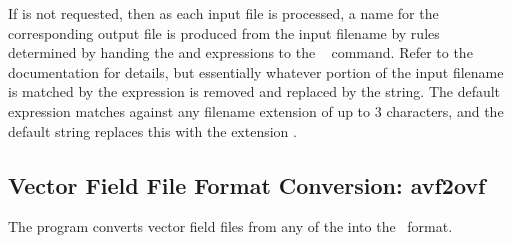 If  is not requested, then as each input file is
processed, a name for the corresponding output file is produced from
the input filename by rules determined by handing the 
and  expressions to the \Tcl\  command.  Refer
to the \Tcl\  documentation for details, but essentially
whatever portion of the input filename is matched by the 
expression is removed and replaced by the  string.  The
default  expression matches against any filename
extension of up to 3 characters, and the default  string
replaces this with the extension .


\subsection{Vector Field File Format Conversion:
          avf2ovf}\label{sec:avf2ovf}%
%
The  program converts vector field files from any of the
 into the \OVF\ format.

